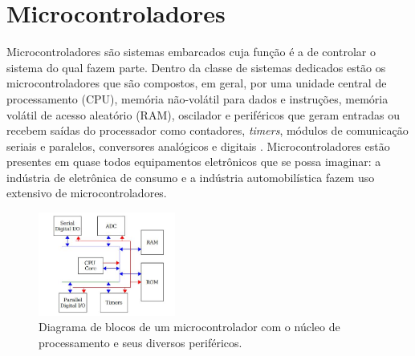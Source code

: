 

\section{Microcontroladores}

Microcontroladores são sistemas embarcados cuja função é a de controlar o sistema do qual fazem parte. Dentro da classe de sistemas dedicados estão os microcontroladores que são compostos, em geral, por uma unidade central de processamento (CPU), memória não-volátil para dados e instruções, memória volátil de acesso aleatório (RAM), oscilador e periféricos que geram entradas ou recebem saídas do processador como contadores, \textit{timers}, módulos de comunicação seriais e paralelos, conversores analógicos e digitais . Microcontroladores estão presentes em quase todos equipamentos eletrônicos que se possa imaginar: a indústria de eletrônica de consumo e a indústria automobilística fazem uso extensivo de microcontroladores.

\begin{figure}[ht]
    \begin{center}
    \includegraphics[width=0.4\textwidth]{figuras/micro.JPG}
    \end{center}
    \caption[Diagrama de blocos de um microcontrolador.]{Diagrama de blocos de um microcontrolador com o núcleo de processamento e seus diversos periféricos.}
    \label{micro}
\end{figure}


